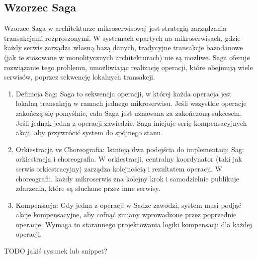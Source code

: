 \subsection{Wzorzec Saga}

Wzorzec Saga w architekturze mikroserwisowej jest strategią zarządzania transakcjami rozproszonymi. W systemach opartych na mikroserwisach, gdzie każdy serwis zarządza własną bazą danych, tradycyjne transakcje bazodanowe (jak te stosowane w monolitycznych architekturach) nie są możliwe. Saga oferuje rozwiązanie tego problemu, umożliwiając realizację operacji, które obejmują wiele serwisów, poprzez sekwencję lokalnych transakcji.

\begin{enumerate}

    \item Definicja Sag: Saga to sekwencja operacji, w której każda operacja jest lokalną transakcją w ramach jednego mikroserwisu. Jeśli wszystkie operacje zakończą się pomyślnie, cała Saga jest uznawana za zakończoną sukcesem. Jeśli jednak jedna z operacji zawiedzie, Saga inicjuje serię kompensacyjnych akcji, aby przywrócić system do spójnego stanu.

    \item Orkiestracja vs Choreografia: Istnieją dwa podejścia do implementacji Sag: orkiestracja i choreografia. W orkiestracji, centralny koordynator (taki jak serwis orkiestracyjny) zarządza kolejnością i rezultatem operacji. W choreografii, każdy mikroserwis zna kolejny krok i samodzielnie publikuje zdarzenia, które są słuchane przez inne serwisy.

    \item Kompensacja: Gdy jedna z operacji w Sadze zawodzi, system musi podjąć akcje kompensacyjne, aby cofnąć zmiany wprowadzone przez poprzednie operacje. Wymaga to starannego projektowania logiki kompensacji dla każdej operacji.

\end{enumerate}

TODO jakiś rysunek lub snippet?